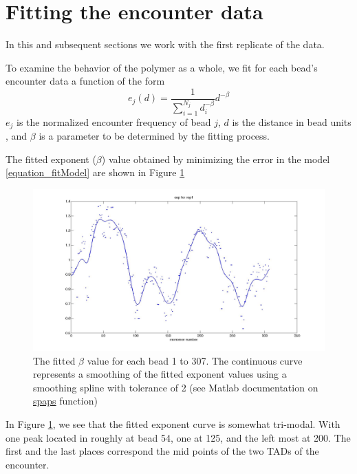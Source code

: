 \documentclass[12pt]{book}
\begin{document}
\section{Fitting the encounter data}\label{section_fittingTheEncounterData}
In this and subsequent sections we work with the first replicate of the data.

To examine the behavior of the polymer as a whole, we fit for each bead's encounter data 
a function of the form 
\begin{equation}\label{equation_fitModel}
e_j(d)= \frac{1}{\sum_{i=1}^{N_j}d_i^{-\beta}}d^{-\beta}
\end{equation}
$e_j$ is the normalized encounter frequency of bead $j$, $d$ is the distance in bead units , and $\beta$ is a parameter to be determined by the fitting process. 

The fitted exponent ($\beta$) value obtained by minimizing the error in the model \ref{equation_fitModel} are shown in Figure \ref{figure_fittedExpExperimentalData307Beads}
\begin{figure}[H]
\includegraphics[scale=0.15]{fittedExpValuesWithSplineRep1}
\caption{\scriptsize{The fitted $\beta$ value for each bead 1 to 307. The continuous curve represents a smoothing of the fitted exponent values using a smoothing spline with tolerance of 2 (see Matlab documentation on \href{http://www.mathworks.fr/fr/help/curvefit/spaps.html}{spaps} function)}}
\label{figure_fittedExpExperimentalData307Beads}
\end{figure}

In Figure \ref{figure_fittedExpExperimentalData307Beads}, we see that the fitted exponent curve is somewhat tri-modal. With one peak located in roughly at bead 54, one at 125, and the left most at 200. The first and the last places correspond the mid points of the two TADs of the encounter. 
\end{document}
